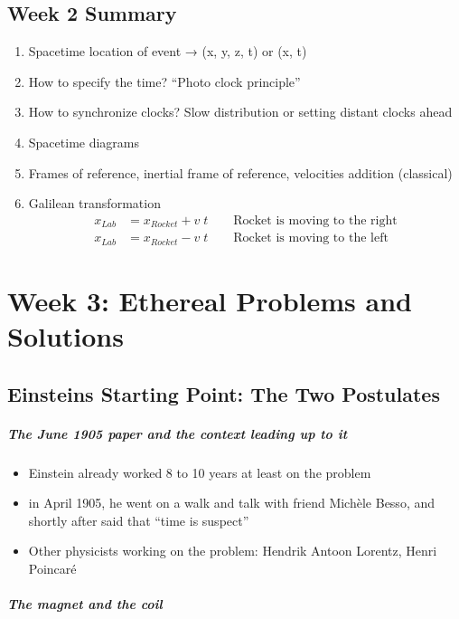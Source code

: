 \documentclass[pagesize,headsepline,10pt,parskip=half]{scrreprt}
\begin{document}
    \section{Week 2 Summary}
      \begin{enumerate}
        \item Spacetime location of event → (x, y, z, t) or (x, t)
        \item How to specify the time? “Photo clock principle”
        \item How to synchronize clocks? Slow distribution or setting distant clocks ahead
        \item Spacetime diagrams
        \item Frames of reference, inertial frame of reference, velocities addition (classical)
        \item Galilean transformation
          \begin{align*}
            x_{Lab} &= x_{Rocket} + v \; t \qquad \text{Rocket is moving to the right}\\
            x_{Lab} &= x_{Rocket} - v \; t \qquad \text{Rocket is moving to the left}
          \end{align*}
      \end{enumerate}

  \chapter{Week 3: Ethereal Problems and Solutions}
    \section{Einsteins Starting Point: The Two Postulates}
      \paragraph{The June 1905 paper and the context leading up to it}
        \begin{itemize}
          \item Einstein already worked 8 to 10 years at least on the problem
          \item in April 1905, he went on a walk and talk with friend Michèle Besso,
            and shortly after said that “time is suspect”
          \item Other physicists working on the problem: Hendrik Antoon Lorentz, Henri Poincaré
        \end{itemize}
      \paragraph{The magnet and the coil}
\end{document}
